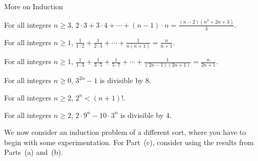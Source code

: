 \begin{section}{More on Induction}
\begin{theorem}
For all integers $n \ge 3$, $\displaystyle{2\cdot 3 + 3 \cdot 4 + \cdots + (n-1)\cdot n = \frac{(n-2)(n^2+2n+3)}{3}}$.
\end{theorem}

\begin{theorem}
For all integers $n \ge 1$, $\displaystyle{\frac{1}{1\cdot 2} + \frac{1}{2\cdot 3} + \cdots + \frac{1}{n(n+1)} = \frac{n}{n+1}}$.
\end{theorem}

\begin{theorem}
For all integers $n \ge 1$, $\displaystyle{\frac{1}{1\cdot 3} + \frac{1}{3\cdot 5} + \frac{1}{5\cdot7} + \cdots + \frac{1}{(2n-1)(2n+1)} = \frac{n}{2n+1}}$.
\end{theorem}

\begin{theorem}\label{thm:3^{2n}-1 div by 8}
For all integers $n \ge 0$, $3^{2n}-1$ is divisible by $8$.
\end{theorem}

\begin{theorem}
For all integers $n \ge 2$, $2^n < (n+1)!$.
\end{theorem}

\begin{theorem}
For all integers $n \ge 2$, $2\cdot 9^n - 10 \cdot 3^n$ is divisible by $4$.
\end{theorem}

We now consider an induction problem of a different sort, where you have to begin with some experimentation. For Part~(c), consider using the results from Parts~(a) and~(b).


\end{section}
